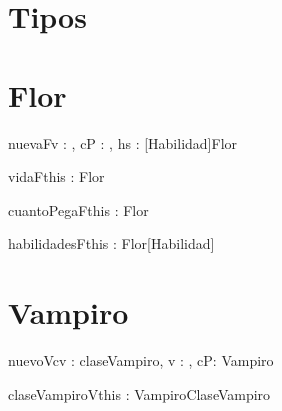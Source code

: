 \documentclass[spanish,a4paper]{article}
\begin{document}



\titulotp

\section{Tipos}



\section{Flor}



\begin{problema}[this]{nuevaF}{v : \ent, cP : \ent, hs : [Habilidad]}{Flor} 


\end{problema}


\begin{problema}{vidaF}{this : Flor}{\ent} 
\end{problema}

\begin{problema}{cuantoPegaF}{this : Flor}{\ent} 
\end{problema}

\begin{problema}{habilidadesF}{this : Flor}{[Habilidad]} 
\end{problema}



\section{Vampiro}



\begin{problema}[this]{nuevoV}{cv : claseVampiro, v : \ent, cP: \ent}{Vampiro}
\end{problema}


\begin{problema}{claseVampiroV}{this : Vampiro}{ClaseVampiro}
\end{problema}
\end{document}
